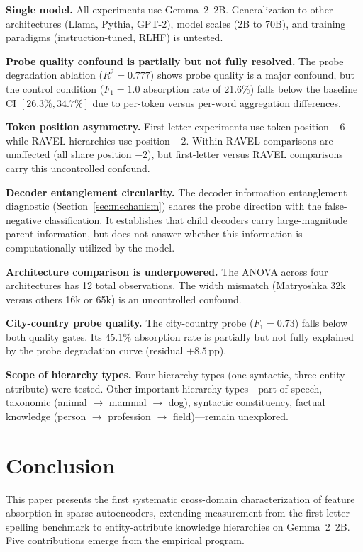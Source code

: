 \documentclass{article}
\begin{document}
\textbf{Single model.} All experiments use Gemma~2~2B. Generalization to other architectures (Llama, Pythia, GPT-2), model scales (2B to 70B), and training paradigms (instruction-tuned, RLHF) is untested.

\textbf{Probe quality confound is partially but not fully resolved.} The probe degradation ablation ($R^2 = 0.777$) shows probe quality is a major confound, but the control condition ($F_1 = 1.0$ absorption rate of 21.6\%) falls below the baseline CI $[26.3\%, 34.7\%]$ due to per-token versus per-word aggregation differences.

\textbf{Token position asymmetry.} First-letter experiments use token position $-6$ while RAVEL hierarchies use position $-2$. Within-RAVEL comparisons are unaffected (all share position $-2$), but first-letter versus RAVEL comparisons carry this uncontrolled confound.

\textbf{Decoder entanglement circularity.} The decoder information entanglement diagnostic (Section~\ref{sec:mechanism}) shares the probe direction with the false-negative classification. It establishes that child decoders carry large-magnitude parent information, but does not answer whether this information is computationally utilized by the model.

\textbf{Architecture comparison is underpowered.} The ANOVA across four architectures has 12 total observations. The width mismatch (Matryoshka 32k versus others 16k or 65k) is an uncontrolled confound.

\textbf{City-country probe quality.} The city-country probe ($F_1 = 0.73$) falls below both quality gates. Its 45.1\% absorption rate is partially but not fully explained by the probe degradation curve (residual $+8.5$\,pp).

\textbf{Scope of hierarchy types.} Four hierarchy types (one syntactic, three entity-attribute) were tested. Other important hierarchy types---part-of-speech, taxonomic (animal $\to$ mammal $\to$ dog), syntactic constituency, factual knowledge (person $\to$ profession $\to$ field)---remain unexplored.

\section{Conclusion}
\label{sec:conclusion}

This paper presents the first systematic cross-domain characterization of feature absorption in sparse autoencoders, extending measurement from the first-letter spelling benchmark to entity-attribute knowledge hierarchies on Gemma~2~2B. Five contributions emerge from the empirical program.
\end{document}
